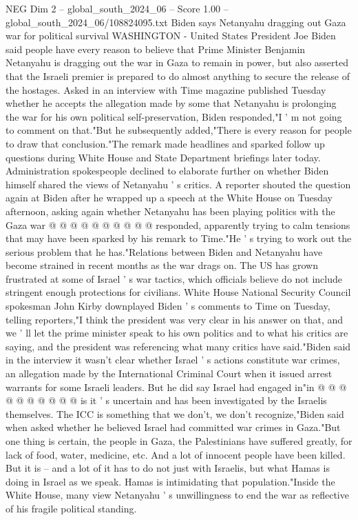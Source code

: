 \begin{textsample}{NEG Dim 2 – global\_south\_2024\_06 – Score 1.00 – global\_south\_2024\_06/108824095.txt}  \label{ex:f2_neg_327}
Biden says Netanyahu dragging out Gaza war for political survival WASHINGTON - United States President Joe Biden said people have every reason to believe that Prime Minister Benjamin Netanyahu is dragging out the war in Gaza to remain in power, but also asserted that the Israeli premier is prepared to do almost anything to secure the release of the hostages.
Asked in an interview with Time magazine published Tuesday whether he accepts the allegation made by some that Netanyahu is prolonging the war for his own political self-preservation, Biden responded,"I ' m not going to comment on that."But he subsequently added,"There is every reason for people to draw that conclusion."The remark made headlines and sparked follow up questions during White House and State Department briefings later today.
Administration spokespeople declined to elaborate further on whether Biden himself shared the views of Netanyahu ' s critics.
A reporter shouted the question again at Biden after he wrapped up a speech at the White House on Tuesday afternoon, asking again whether Netanyahu has been playing politics with the Gaza war @ @ @ @ @ @ @ @ @ @ responded, apparently trying to calm tensions that may have been sparked by his remark to Time."He ' s trying to work out the serious problem that he has."Relations between Biden and Netanyahu have become strained in recent months as the war drags on.
The US has grown frustrated at some of Israel ' s war tactics, which officials believe do not include stringent enough protections for civilians.
White House National Security Council spokesman John Kirby downplayed Biden ' s comments to Time on Tuesday, telling reporters,"I think the president was very clear in his answer on that, and we ' ll let the prime minister speak to his own politics and to what his critics are saying, and the president was referencing what many critics have said."Biden said in the interview it wasn't clear whether Israel ' s actions constitute war crimes, an allegation made by the International Criminal Court when it issued arrest warrants for some Israeli leaders.
But he did say Israel had engaged in"in @ @ @ @ @ @ @ @ @ @ is it ' s uncertain and has been investigated by the Israelis themselves.
The ICC is something that we don't, we don't recognize,"Biden said when asked whether he believed Israel had committed war crimes in Gaza."But one thing is certain, the people in Gaza, the Palestinians have suffered greatly, for lack of food, water, medicine, etc.
And a lot of innocent people have been killed.
But it is -- and a lot of it has to do not just with Israelis, but what Hamas is doing in Israel as we speak.
Hamas is intimidating that population."Inside the White House, many view Netanyahu ' s unwillingness to end the war as reflective of his fragile political standing.

\end{textsample}
